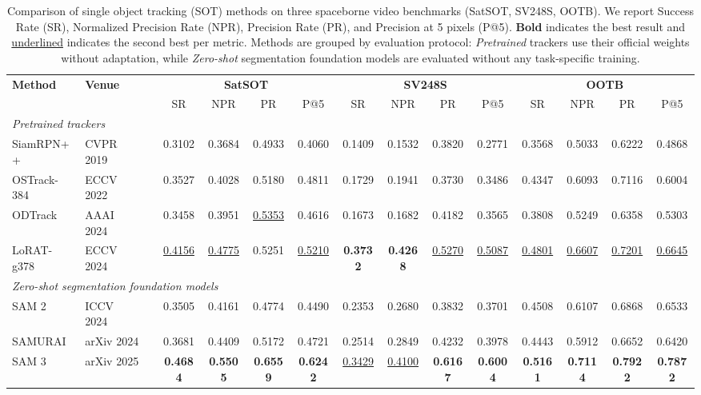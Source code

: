 
\begin{table}[t]
\centering
\caption{Comparison of single object tracking (SOT) methods on three spaceborne video benchmarks (SatSOT, SV248S, OOTB). We report Success Rate (SR), Normalized Precision Rate (NPR), Precision Rate (PR), and Precision at 5 pixels (P@5). \textbf{Bold} indicates the best result and \underline{underlined} indicates the second best per metric. Methods are grouped by evaluation protocol: \emph{Pretrained} trackers use their official weights without adaptation, while \emph{Zero-shot} segmentation foundation models are evaluated without any task-specific training.}
\label{tab:sot_results}
\setlength{\tabcolsep}{4pt}
\renewcommand{\arraystretch}{1.15}
\small
\begin{tabular}{l l c *{4}{c} *{4}{c} *{4}{c}}
\toprule
\multirow{2}{*}{\textbf{Method}} & \multirow{2}{*}{\textbf{Venue}} & & \multicolumn{4}{c}{\textbf{SatSOT}} & \multicolumn{4}{c}{\textbf{SV248S}} & \multicolumn{4}{c}{\textbf{OOTB}} \\
\cmidrule(lr){4-7} \cmidrule(lr){8-11} \cmidrule(lr){12-15}
 & & & SR & NPR & PR & P@5 & SR & NPR & PR & P@5 & SR & NPR & PR & P@5 \\
\midrule
\multicolumn{15}{l}{\textit{Pretrained trackers}} \\
\midrule
SiamRPN++    & CVPR 2019 & & 0.3102 & 0.3684 & 0.4933 & 0.4060 & 0.1409 & 0.1532 & 0.3820 & 0.2771 & 0.3568 & 0.5033 & 0.6222 & 0.4868 \\
OSTrack-384  & ECCV 2022 & & 0.3527 & 0.4028 & 0.5180 & 0.4811 & 0.1729 & 0.1941 & 0.3730 & 0.3486 & 0.4347 & 0.6093 & 0.7116 & 0.6004 \\
ODTrack      & AAAI 2024 & & 0.3458 & 0.3951 & \underline{0.5353} & 0.4616 & 0.1673 & 0.1682 & 0.4182 & 0.3565 & 0.3808 & 0.5249 & 0.6358 & 0.5303 \\
LoRAT-g378   & ECCV 2024 & & \underline{0.4156} & \underline{0.4775} & 0.5251 & \underline{0.5210} & \textbf{0.3732} & \textbf{0.4268} & \underline{0.5270} & \underline{0.5087} & \underline{0.4801} & \underline{0.6607} & \underline{0.7201} & \underline{0.6645} \\
\midrule
\multicolumn{15}{l}{\textit{Zero-shot segmentation foundation models}} \\
\midrule
SAM 2        & ICCV 2024  & & 0.3505 & 0.4161 & 0.4774 & 0.4490 & 0.2353 & 0.2680 & 0.3832 & 0.3701 & 0.4508 & 0.6107 & 0.6868 & 0.6533 \\
SAMURAI      & arXiv 2024 & & 0.3681 & 0.4409 & 0.5172 & 0.4721 & 0.2514 & 0.2849 & 0.4232 & 0.3978 & 0.4443 & 0.5912 & 0.6652 & 0.6420 \\
SAM 3        & arXiv 2025 & & \textbf{0.4684} & \textbf{0.5505} & \textbf{0.6559} & \textbf{0.6242} & \underline{0.3429} & \underline{0.4100} & \textbf{0.6167} & \textbf{0.6004} & \textbf{0.5161} & \textbf{0.7114} & \textbf{0.7922} & \textbf{0.7872} \\
\bottomrule
\end{tabular}
\end{table}
